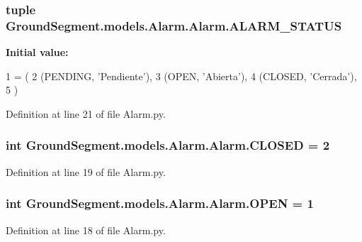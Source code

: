 \subsubsection[{A\+L\+A\+R\+M\+\_\+\+S\+T\+A\+T\+U\+S}]{\setlength{\rightskip}{0pt plus 5cm}tuple Ground\+Segment.\+models.\+Alarm.\+Alarm.\+A\+L\+A\+R\+M\+\_\+\+S\+T\+A\+T\+U\+S}\label{namespace_ground_segment_1_1models_1_1_alarm_1_1_alarm_afbe0bd9a88ba48a14a30f9a148b8f9c4}
{\bfseries Initial value\+:}
\begin{DoxyCode}
1 = (
2     (PENDING, \textcolor{stringliteral}{'Pendiente'}),
3     (OPEN, \textcolor{stringliteral}{'Abierta'}),    
4     (CLOSED, \textcolor{stringliteral}{'Cerrada'}),
5 )
\end{DoxyCode}


Definition at line 21 of file Alarm.\+py.

\hypertarget{namespace_ground_segment_1_1models_1_1_alarm_1_1_alarm_af486c75414a4a8ebd2033a4df946ae67}{}
\subsubsection[{C\+L\+O\+S\+E\+D}]{\setlength{\rightskip}{0pt plus 5cm}int Ground\+Segment.\+models.\+Alarm.\+Alarm.\+C\+L\+O\+S\+E\+D = 2}\label{namespace_ground_segment_1_1models_1_1_alarm_1_1_alarm_af486c75414a4a8ebd2033a4df946ae67}


Definition at line 19 of file Alarm.\+py.

\hypertarget{namespace_ground_segment_1_1models_1_1_alarm_1_1_alarm_a0627d177d994c21e4a00b2f618c65c99}{}
\subsubsection[{O\+P\+E\+N}]{\setlength{\rightskip}{0pt plus 5cm}int Ground\+Segment.\+models.\+Alarm.\+Alarm.\+O\+P\+E\+N = 1}\label{namespace_ground_segment_1_1models_1_1_alarm_1_1_alarm_a0627d177d994c21e4a00b2f618c65c99}


Definition at line 18 of file Alarm.\+py.

